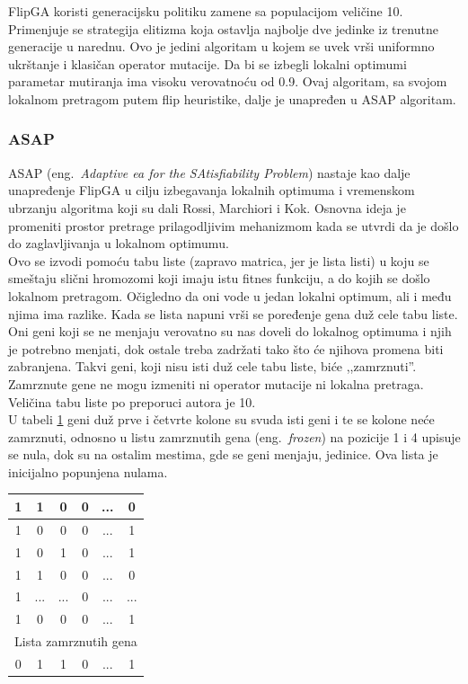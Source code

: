 \documentclass[a4paper]{article}
\begin{document}
FlipGA koristi generacijsku politiku zamene sa populacijom veličine 10.
Primenjuje se strategija elitizma koja ostavlja najbolje dve jedinke iz trenutne generacije 
u narednu. Ovo je jedini algoritam u kojem se uvek vrši uniformno ukrštanje i klasičan operator mutacije. Da bi se izbegli lokalni optimumi parametar mutiranja 
ima visoku verovatnoću od 0.9. 
Ovaj algoritam, sa svojom lokalnom pretragom putem flip heuristike,
dalje je unapređen u ASAP algoritam.


\subsubsection{ASAP}
\label{sec:ea_asap}
ASAP (eng.~{\em Adaptive ea for the SAtisfi­ability Problem}) \cite{adaptiveEA, ea_with_table} nastaje kao dalje unapređenje FlipGA u cilju izbegavanja lokalnih optimuma
i vremenskom ubrzanju algoritma koji su dali Rossi, Marchiori i Kok. 
Osnovna ideja je promeniti prostor pretrage prilagodljivim mehanizmom 
kada se utvrdi da je došlo do zaglavljivanja u lokalnom optimumu. \\

Ovo se izvodi pomoću tabu liste (zapravo matrica, jer je lista listi) 
u koju se smeštaju slični hromozomi koji imaju
istu fitnes funkciju, a do kojih se došlo lokalnom pretragom. Očigledno da oni vode u
jedan lokalni optimum, ali i među njima ima razlike. Kada se lista napuni vrši se poređenje
gena duž cele tabu liste.
Oni geni koji se ne menjaju verovatno su nas doveli do lokalnog optimuma 
i njih je potrebno menjati, dok ostale treba
zadržati tako što će njihova promena biti zabranjena. Takvi geni, koji nisu isti duž cele
tabu liste, biće ,,zamrznuti''. Zamrznute gene ne mogu izmeniti ni operator mutacije
ni lokalna pretraga. Veličina tabu liste po preporuci autora je 10.\\

U tabeli \ref{tab:ea_tabu_list} geni duž prve i četvrte kolone su svuda isti geni i te
se kolone neće zamrznuti, odnosno u listu zamrznutih gena (eng.~{\em frozen}) na pozicije 1 i 4 upisuje se
nula, dok su na ostalim mestima, gde se geni menjaju, jedinice. 
Ova lista je inicijalno popunjena nulama.

\begin{table}[h!]
\centering
{}\label{tab:ea_tabu_list} 
\begin{tabular}{|*{6}{c|}}
 \hline
  1 & 1 & 0 & 0 & ... & 0 \\ \hline
  1 & 0 & 0 & 0 & ... & 1 \\ \hline
  1 & 0 & 1 & 0 & ... & 1 \\ \hline
  1 & 1 & 0 & 0 & ... & 0 \\ \hline
  1 & ... & ... & 0 & ... & ... \\ \hline
  1 & 0 & 0 & 0 & ... & 1 \\ \hline \hline
  \multicolumn{6}{|c|}{Lista zamrznutih gena} \\ \hline
  0 & 1 & 1 & 0 & ... & 1 \\ \hline
\end{tabular}
\end{table}
\end{document}

